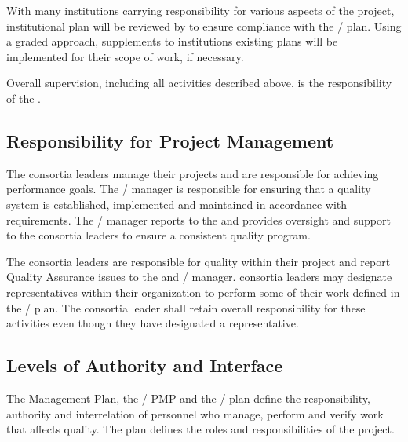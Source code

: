 With many institutions carrying responsibility for various aspects of
the project, institutional  plan will be reviewed by 
 to ensure compliance with the /  plan. Using a
graded approach, supplements to institutions existing plans will be
implemented for their  scope of work, if necessary.

Overall  supervision, including all activities described above, is
the responsibility of the  .

\subsection{Responsibility for Project Management}

The  consortia leaders manage their projects and are
responsible for achieving performance goals. The
/  manager is responsible for
ensuring that a quality system is established, implemented and
maintained in accordance with requirements. The
/  manager reports to the
  and provides oversight and support
to the consortia leaders to ensure a consistent quality program.

The  consortia leaders are responsible for quality within
their project and report Quality Assurance issues to the 
 and / 
manager.  consortia leaders may designate 
representatives within their organization to perform some of their
work defined in the /  plan. The
 consortia leader shall retain overall responsibility for
these activities even though they have designated a 
representative.

\subsection{Levels of Authority and Interface}

The  Management Plan, the / PMP
and the /  plan define the
responsibility, authority and interrelation of personnel who manage,
perform and verify work that affects quality. The  plan defines
the  roles and responsibilities of the  project.

